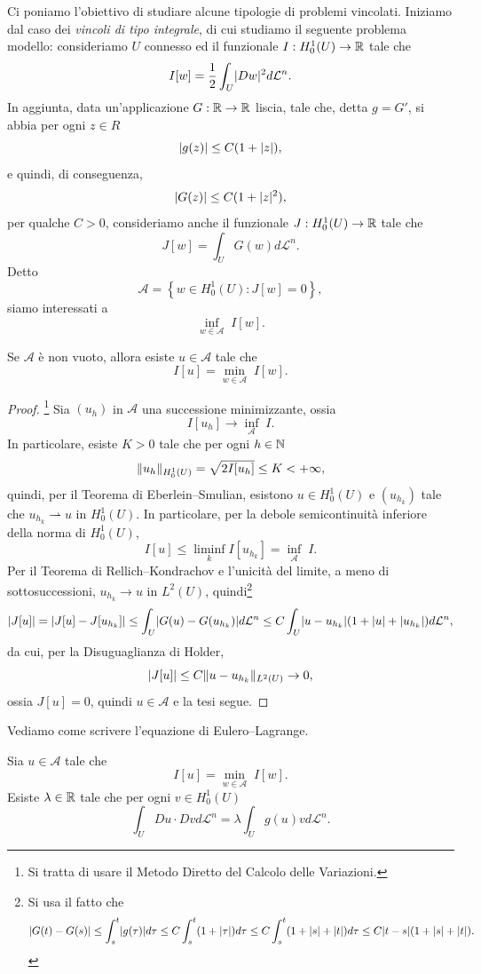 Ci poniamo l'obiettivo di studiare alcune tipologie di problemi vincolati. Iniziamo dal caso dei \emph{vincoli di tipo integrale}, di cui studiamo il seguente problema modello: consideriamo $U$ connesso ed il funzionale $I: H^1_0(U) \to \mathbb{R}$ tale che
\[ I[w] = \frac{1}{2}\int_U \lvert Dw\rvert^2 d\mathcal{L}^n. \]
In aggiunta, data un'applicazione $G: \mathbb{R}\to \mathbb{R}$ liscia, tale che, detta $g= G'$, si abbia per ogni $z \in R$
\[ \lvert g(z)\rvert\le C(1+\lvert z\rvert), \]
e quindi, di conseguenza,
\[ \lvert G(z)\rvert\le C(1+\lvert z\rvert^2), \]
per qualche $C >0$, consideriamo anche il funzionale $J: H^1_0(U) \to \mathbb{R}$ tale che
\[ J[w] = \int_U G(w)d\mathcal{L}^n. \]
Detto 
\[ \mathcal{A} = \left\lbrace w \in H^1_0(U): J[w] = 0\right\rbrace, \]
siamo interessati a 
\[ \underset{w \in \mathcal{A}}{\inf}\; I[w]. \]
\begin{teorema}
	Se $\mathcal{A}$ è non vuoto, allora esiste $u \in \mathcal{A}$ tale che 
	\[ I[u] =  \underset{w \in \mathcal{A}}{\min}\; I[w]. \] 
\end{teorema}
\begin{proof}\footnote{Si tratta di usare il Metodo Diretto del Calcolo delle Variazioni.}
Sia $(u_h)$ in $\mathcal{A}$ una successione minimizzante, ossia 
\[ I[u_h] \to \underset{\mathcal{A}}{\inf}\; I. \]
In particolare, esiste $K>0$ tale che per ogni $h \in \mathbb{N}$
\[ \lVert u_h\rVert_{H^1_0(U)} = \sqrt{2 I[u_h]} \le K <+\infty, \]
quindi, per il Teorema di Eberlein--Smulian, esistono $u \in H^1_0(U)$ e $(u_{h_k})$ tale che $u_{h_k} \rightharpoonup u$ in $H^1_0(U)$. In particolare, per la debole semicontinuità inferiore della norma di $H^1_0(U)$, 
\[ I[u] \le \underset{k}{\liminf} I[u_{h_k}] = \underset{\mathcal{A}}{\inf}\; I. \]
Per il Teorema di Rellich--Kondrachov e l'unicità del limite, a meno di sottosuccessioni, $u_{h_k} \to u$ in $L^2(U)$, quindi\footnote{Si usa il fatto che 
\[ \lvert G(t)-G(s)\rvert \le \int_s^t \lvert g(\tau)\rvert d\tau \le C \int_s^t (1+\lvert\tau\rvert) d\tau \le C\int_s^t (1+\lvert s\rvert+\lvert t\rvert)d\tau \le C\lvert t-s\rvert(1+\lvert s\rvert+\lvert t\rvert).\]
} 
\[ \lvert J[u]\rvert = \lvert J[u]-J[u_{h_k}]\rvert\le \int_U \lvert G(u)-G(u_{h_k})\rvert d\mathcal{L}^n \le C \int_U \lvert u-u_{h_k}\rvert(1+\lvert u\rvert+\lvert u_{h_k}\rvert)d\mathcal{L}^n,\]
da cui, per la Disuguaglianza di Holder,
\[ \lvert J[u]\rvert  \le C \lVert u-u_{h_k}\rVert_{L^2(U)} \to 0, \]
ossia $J[u] = 0$, quindi $u \in \mathcal{A}$ e la tesi segue.
\end{proof}
Vediamo come scrivere l'equazione di Eulero--Lagrange.
\begin{teorema}
Sia $u \in \mathcal{A}$ tale che 
	\[ I[u] =  \underset{w \in \mathcal{A}}{\min}\; I[w]. \]
Esiste $\lambda \in \mathbb{R}$ tale che per ogni $v \in H^1_0(U)$ 
\[ \int_U Du\cdot Dv d\mathcal{L}^n = \lambda \int_U g(u)v d\mathcal{L}^n. \]
\end{teorema}
